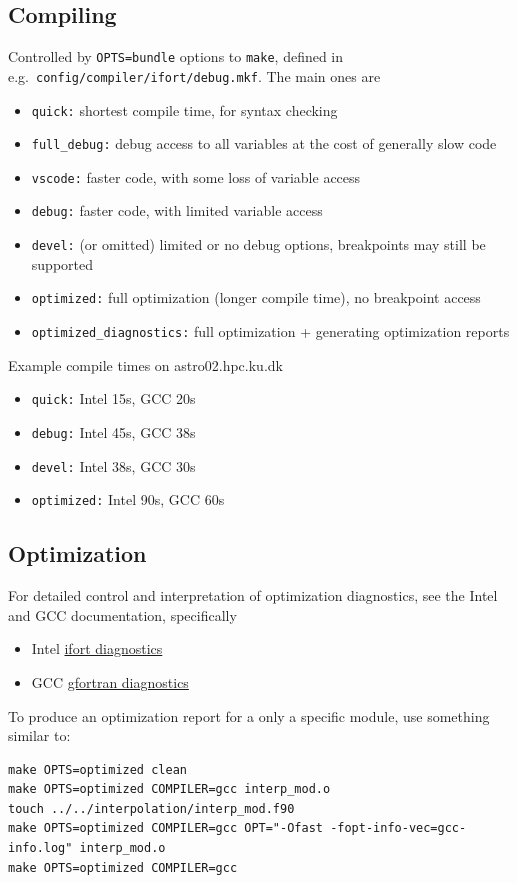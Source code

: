 \documentclass[paper=a4,fontsize=11pt]{scrartcl}
\numberwithin{equation}{section}		%
\numberwithin{figure}{section}			%
\numberwithin{table}{section}				%
\newcommand{\txtcolor}{\color{Mahogany}}
\newcommand{\cmdcolor}{\color{ForestGreen}}
\newcommand{\filecolor}{\color{NavyBlue}}
\newcommand{\File}[1]{{\filecolor\texttt{#1}}}
\newcommand{\Text}[1]{{\txtcolor\texttt{#1}}}
\newcommand{\Cmd}[1]{{\cmdcolor\texttt{#1}}}
\begin{document}
\subsection{Compiling}
Controlled by \Text{OPTS=bundle} options to \Cmd{make}, defined in e.g.\ \File{config/compiler/ifort/}\Text{debug.mkf}. The main ones are
\begin{itemize} 
    \item{\Text{quick:}} shortest compile time, for syntax checking
    \item{\Text{full\_debug:}} debug access to all variables at the cost of generally slow code
    \item{\Text{vscode:}} faster code, with some loss of variable access
    \item{\Text{debug:}} faster code, with limited variable access
    \item{\Text{devel:} (or omitted)} limited or no debug options, breakpoints may still be supported
    \item{\Text{optimized:}} full optimization (longer compile time), no breakpoint access
    \item{\Text{optimized\_diagnostics:}} full optimization + generating optimization reports
\end{itemize}
Example compile times on astro02.hpc.ku.dk
\begin{itemize} 
    \item{\Text{quick:}} Intel 15s, GCC 20s
    \item{\Text{debug:}} Intel 45s, GCC 38s
    \item{\Text{devel:}} Intel 38s, GCC 30s
    \item{\Text{optimized:}} Intel 90s, GCC 60s
\end{itemize}

\subsection{Optimization}
For detailed control and interpretation of optimization diagnostics, see the Intel and GCC documentation, specifically
\begin{itemize}
    \item{Intel} \href{https://www.intel.com/content/www/us/en/developer/articles/technical/capitalize-on-intel-compiler-optimization-reports.html}{ifort diagnostics}
    \item{GCC} \href{https://gcc.gnu.org/onlinedocs/gcc/Developer-Options.html}{gfortran diagnostics}
\end{itemize}
To produce an optimization report for a only a specific module, use something similar to:
{\small\cmdcolor\begin{verbatim}
make OPTS=optimized clean
make OPTS=optimized COMPILER=gcc interp_mod.o
touch ../../interpolation/interp_mod.f90
make OPTS=optimized COMPILER=gcc OPT="-Ofast -fopt-info-vec=gcc-info.log" interp_mod.o
make OPTS=optimized COMPILER=gcc   
\end{verbatim}}
\end{document}
